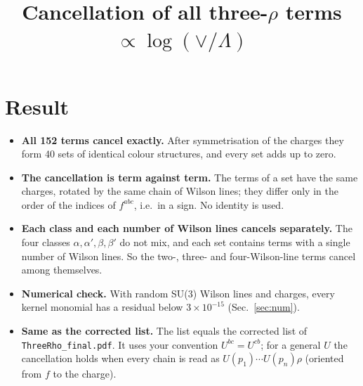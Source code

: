 \documentclass[10pt]{article}
\title{Cancellation of all three-$\rho$ terms $\propto\log(\vee/\Lambda)$}
\date{}
\begin{document}
\maketitle
\sloppy
\section*{Result}
\begin{itemize}
\item \textbf{All 152 terms cancel exactly.} After symmetrisation of the charges they form 40 sets of identical colour structures, and every set adds up to zero.
\item \textbf{The cancellation is term against term.} The terms of a set have the same charges, rotated by the same chain of Wilson lines; they differ only in the order of the indices of $f^{abc}$, i.e.\ in a sign. No identity is used.
\item \textbf{Each class and each number of Wilson lines cancels separately.} The four classes $\alpha,\alpha',\beta,\beta'$ do not mix, and each set contains terms with a single number of Wilson lines. So the two-, three- and four-Wilson-line terms cancel among themselves.
\item \textbf{Numerical check.} With random SU(3) Wilson lines and charges, every kernel monomial has a residual below $3\times10^{-15}$ (Sec.~\ref{sec:num}).
\item \textbf{Same as the corrected list.} The list equals the corrected list of \texttt{ThreeRho\_final.pdf}. It uses your convention $U^{bc}=U^{cb}$; for a general $U$ the cancellation holds when every chain is read as $U(p_1)\cdots U(p_n)\rho$ (oriented from $f$ to the charge).
\end{itemize}
\end{document}
